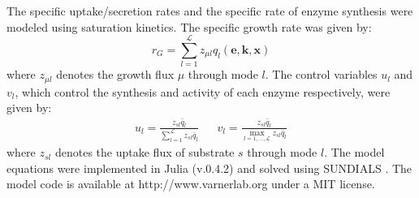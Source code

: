 \documentclass[10pt,twocolumn,twoside,final]{IEEEtran}
\begin{document}
The specific uptake/secretion rates and the specific rate of enzyme synthesis were modeled using saturation kinetics.
The specific growth rate was given by:
\begin{equation}\nonumber
	r_{G}  = \sum_{l = 1}^{\mathcal{L}}z_{\mu l}q_{l}\left(\mathbf{e},\mathbf{k},\mathbf{x}\right)
\end{equation}
where $z_{\mu l}$ denotes the growth flux $\mu$ through mode $l$.
The control variables $u_{l}$ and $v_{l}$, which control the synthesis and activity of each enzyme respectively, were given by:
\begin{align*}
	u_{l}  = \frac{z_{sl}\bar{q}_{l}}{\sum\limits_{l = 1}^{\mathcal{L}}z_{sl}\bar{q}_{l}} && v_{l} = \frac{z_{sl}\bar{q}_{l}}{\max\limits_{l=1,\hdots,\mathcal{L}}z_{sl}\bar{q}_{l}}
\end{align*}
where $z_{sl}$ denotes the uptake flux of substrate $s$ through mode $l$.
The model equations were implemented in Julia (v.0.4.2) \cite{Julia} and solved using SUNDIALS \cite{Sundials}.
The model code is available at http://www.varnerlab.org under a MIT license.


\end{document}
